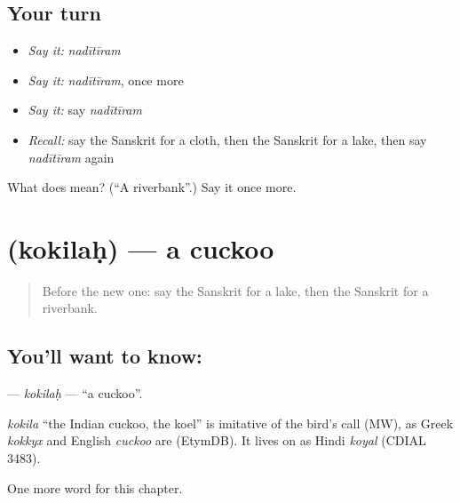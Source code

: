 \subsection*{Your turn}
\begin{itemize}
\raggedright
  \item \emph{Say it:} \emph{nadītīram}
  \item \emph{Say it:} \emph{nadītīram}, once more
  \item \emph{Say it:} say \emph{nadītīram}
  \item \emph{Recall:} say the Sanskrit for a cloth, then the Sanskrit for a lake, then say \emph{nadītīram} again
\end{itemize}

\begin{tcolorbox}[breakable,colback=teal!4,colframe=teal!35!black,title={Before you move on}]
What does  mean? (\textquotedblleft{}A riverbank\textquotedblright{}.) Say it once more.
\end{tcolorbox}
\section[\texorpdfstring{\sk{कोकिलः} (kokilaḥ)}{कोकिलः (kokilaḥ)}]{ (kokilaḥ) — a cuckoo}

\label{lesson:SA-C124-kokilah}



\begin{quote}
Before the new one: say the Sanskrit for a lake, then the Sanskrit for a riverbank.
\end{quote}

\subsection*{You'll want to know: }
\textbf{} — \emph{kokilaḥ} — \textquotedblleft{}a cuckoo\textquotedblright{}.

\begin{cousinweb}
\emph{kokila} \textquotedblleft{}the Indian cuckoo, the koel\textquotedblright{} is imitative of the bird's call (MW), as Greek \emph{kokkyx} and English \emph{cuckoo} are (EtymDB). It lives on as Hindi \emph{koyal} (CDIAL 3483).
\end{cousinweb}

\begin{grammarlens}[title={What you've built}]
One more word for this chapter.
\end{grammarlens}

